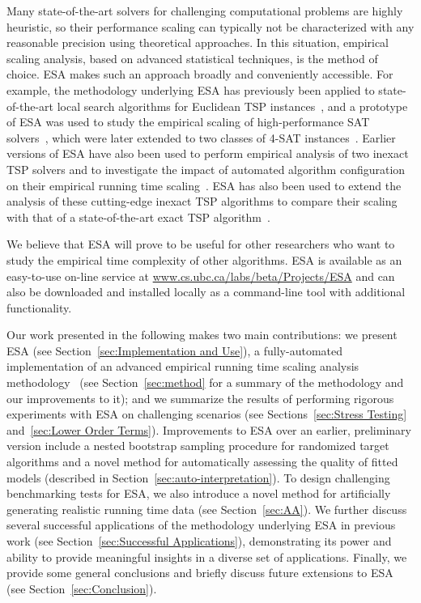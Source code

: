 \documentclass[aic]{iosart2x}
\begin{document}
Many state-of-the-art solvers for challenging computational problems are highly heuristic, so their performance scaling can typically not be characterized with any reasonable precision using theoretical approaches.
In this situation, empirical scaling analysis, based on advanced statistical techniques, is the method of choice. 
ESA makes such an approach broadly and conveniently accessible. 
For example, the methodology underlying ESA has previously been applied to state-of-the-art local search algorithms for Euclidean TSP instances~\cite{DubEtAl15}, and a prototype of ESA was used to study the empirical scaling of high-performance SAT solvers~\cite{MuHoo15}, which were later extended to two classes of 4-SAT instances~\cite{Mu15}. 
Earlier versions of ESA have also been used to perform empirical analysis of two inexact TSP solvers and to investigate the impact of automated algorithm configuration on their empirical running time scaling~\cite{MuEtAl16,Mu15}. 
ESA has also been used to extend the analysis of these cutting-edge inexact TSP algorithms to compare their scaling with that of a state-of-the-art exact TSP algorithm~\cite{MuEtAl17}.

We believe that ESA will prove to be useful for other researchers who want to study the empirical time complexity of other algorithms. ESA is available as an easy-to-use on-line service at \url{www.cs.ubc.ca/labs/beta/Projects/ESA} and can also be downloaded and installed locally as a command-line tool with additional functionality.

Our work presented in the following makes two main contributions: 
we present ESA (see Section~\ref{sec:Implementation and Use}), a fully-automated implementation of an advanced empirical running time scaling analysis methodology~\cite{Hoo09} (see Section~\ref{sec:method} for a summary of the methodology and our improvements to it); and we summarize the results of performing rigorous experiments with ESA on challenging scenarios (see Sections~\ref{sec:Stress Testing} and~\ref{sec:Lower Order Terms}). 
Improvements to ESA over an earlier, preliminary version include a nested bootstrap sampling procedure for randomized target algorithms and a novel method for automatically assessing the quality of fitted models (described in Section~\ref{sec:auto-interpretation}). 
To design challenging benchmarking tests for ESA, we also introduce a novel method for artificially generating realistic running time data (see Section~\ref{sec:AA}). 
We further discuss several successful applications of the methodology underlying ESA in previous work (see Section~\ref{sec:Successful Applications}), demonstrating its power and ability to provide meaningful insights in a diverse set of applications. 
Finally, we provide some general conclusions and briefly discuss future extensions to ESA (see Section~\ref{sec:Conclusion}).
\end{document}
